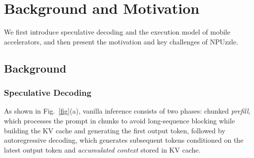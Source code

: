 \documentclass[sigconf,nonacm,10pt]{acmart}
\newcommand{\name}{NPUzzle\xspace}
\begin{document}
\section{Background and Motivation}
We first introduce speculative decoding and the execution model of mobile accelerators, and then present the motivation and key challenges of \name.

\subsection{Background} \label{sec:background}

\subsubsection{Speculative Decoding} \label{sec:spec}
{\color{blue}
As shown in {\color{red}Fig.~\ref{fig}(a)}, vanilla inference consists of two phases: chunked \emph{prefill}, which processes the prompt in chunks to avoid long-sequence blocking while building the KV cache and generating the first output token, followed by autoregressive decoding, which generates subsequent tokens conditioned on the latest output token and \emph{accumulated context} stored in KV cache.
}

\end{document}
